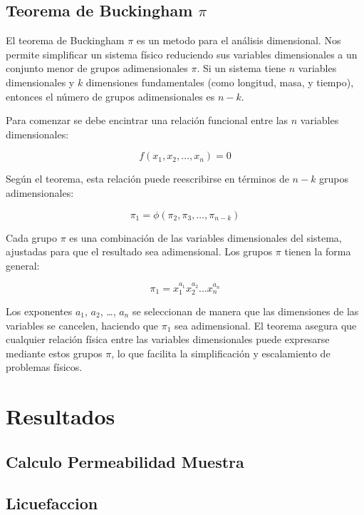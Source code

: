 \subsection{Teorema de Buckingham $\pi$}

El teorema de Buckingham $\pi$ es un metodo para el análisis dimensional. Nos permite simplificar un sistema físico reduciendo sus variables dimensionales a un conjunto menor de grupos adimensionales $\pi$. Si un sistema tiene $n$ variables dimensionales y $k$ dimensiones fundamentales (como longitud, masa, y tiempo), entonces el número de grupos adimensionales es $n - k$.

Para comenzar se debe encintrar una relación funcional entre las $n$ variables dimensionales:

\begin{equation}
f(x_1, x_2, \ldots, x_n) = 0
\end{equation}

Según el teorema, esta relación puede reescribirse en términos de $n - k$ grupos adimensionales:

\begin{equation}
\pi_1 = \phi(\pi_2, \pi_3, \ldots, \pi_{n-k})
\end{equation}

Cada grupo $\pi$ es una combinación de las variables dimensionales del sistema, ajustadas para que el resultado sea adimensional. Los grupos $\pi$ tienen la forma general:

\begin{equation}
\pi_1 = x_1^{a_1} x_2^{a_2} \ldots x_n^{a_n}
\end{equation}

Los exponentes $a_1$, $a_2$, \ldots, $a_n$ se seleccionan de manera que las dimensiones de las variables se cancelen, haciendo que $\pi_1$ sea adimensional. El teorema asegura que cualquier relación física entre las variables dimensionales puede expresarse mediante estos grupos $\pi$, lo que facilita la simplificación y escalamiento de problemas físicos.

\section{Resultados}

\subsection{Calculo Permeabilidad Muestra}

\subsection{Licuefaccion}

